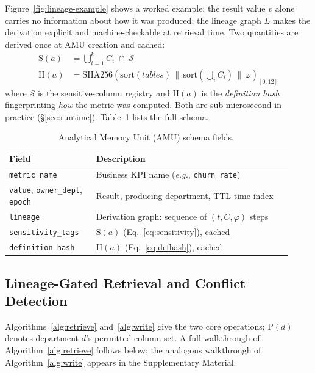 \documentclass[nolineno]{ieeeaccess}
\begin{document}
Figure~\ref{fig:lineage-example} shows a worked example: the result value
$v$ alone carries no information about how it was produced; the lineage
graph $L$ makes the derivation explicit and machine-checkable at retrieval
time.
Two quantities are derived once at AMU creation and cached:
\begin{align}
  \mathrm{S}(a) &= \bigcup_{i=1}^{k} C_i \;\cap\; \mathcal{S}
  \label{eq:sensitivity} \\[2pt]
  \mathrm{H}(a) &= \mathrm{SHA256}\!\left(
    \mathrm{sort}(\mathit{tables}) \,\|\,
    \mathrm{sort}\!\left(\bigcup_i C_i\right) \,\|\, \varphi
  \right)_{\![0{:}12]}
  \label{eq:defhash}
\end{align}
where $\mathcal{S}$ is the sensitive-column registry and $\mathrm{H}(a)$ is
the \emph{definition hash} fingerprinting \emph{how} the metric was
computed.
Both are sub-microsecond in practice (\S\ref{sec:runtime}).
Table~\ref{tab:amu} lists the full schema.

\begin{table}[t]
\centering
\caption{Analytical Memory Unit (AMU) schema fields.}
\label{tab:amu}
\footnotesize
\begin{tabular}{@{}p{0.29\linewidth}p{0.63\linewidth}@{}}
\toprule
\textbf{Field} & \textbf{Description} \\
\midrule
\texttt{metric\_name}      & Business KPI name (\emph{e.g.}, \texttt{churn\_rate}) \\
\texttt{value}, \texttt{owner\_dept}, \texttt{epoch} & Result, producing department, TTL time index \\
\texttt{lineage}           & Derivation graph: sequence of $(t, C, \varphi)$ steps \\
\texttt{sensitivity\_tags} & $\mathrm{S}(a)$ (Eq.~\ref{eq:sensitivity}), cached \\
\texttt{definition\_hash}  & $\mathrm{H}(a)$ (Eq.~\ref{eq:defhash}), cached \\
\bottomrule
\end{tabular}
\end{table}

\FloatBarrier
\subsection{Lineage-Gated Retrieval and Conflict Detection}
\label{sec:algorithms}

Algorithms~\ref{alg:retrieve} and~\ref{alg:write} give the two core
operations; $\mathrm{P}(d)$ denotes department $d$'s permitted column set.
A full walkthrough of Algorithm~\ref{alg:retrieve} follows below; the
analogous walkthrough of Algorithm~\ref{alg:write} appears in the
Supplementary Material.
\end{document}
